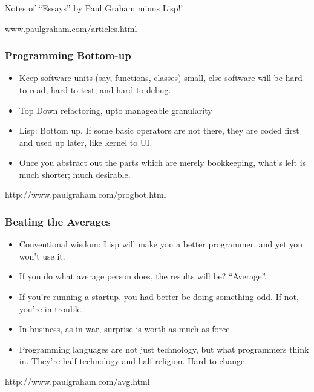 \begin{frame}[fragile]\frametitle{}
\begin{center}
{\Large Notes of ``Essays'' by Paul Graham minus Lisp!!}

{\tiny www.paulgraham.com/articles.html}


\end{center}
\end{frame}


\begin{frame}[fragile]\frametitle{Programming Bottom-up}

\begin{itemize}
\item Keep software units (say, functions, classes) small, else software will be hard to read, hard to test, and hard to debug.
\item Top Down refactoring, upto manageable granularity
\item Lisp: Bottom up. If some basic operators are not there, they are coded first and used up later, like kernel to UI.
\item Once you abstract out the parts which are merely bookkeeping, what's left is much shorter; much desirable.
\end{itemize}

{\tiny http://www.paulgraham.com/progbot.html}

\end{frame}

\begin{frame}[fragile]\frametitle{Beating the Averages}

\begin{itemize}
\item Conventional wisdom: Lisp will make you a better programmer, and yet you won't use it.
\item If you do what average person does, the results will be? ``Average''.
\item If you're running a startup, you had better be doing something odd. If not, you're in trouble.
\item  In business, as in war, surprise is worth as much as force.
\item Programming languages are not just technology, but what programmers think in. They're half technology and half religion. Hard to change.
\end{itemize}

{\tiny http://www.paulgraham.com/avg.html}

\end{frame}

